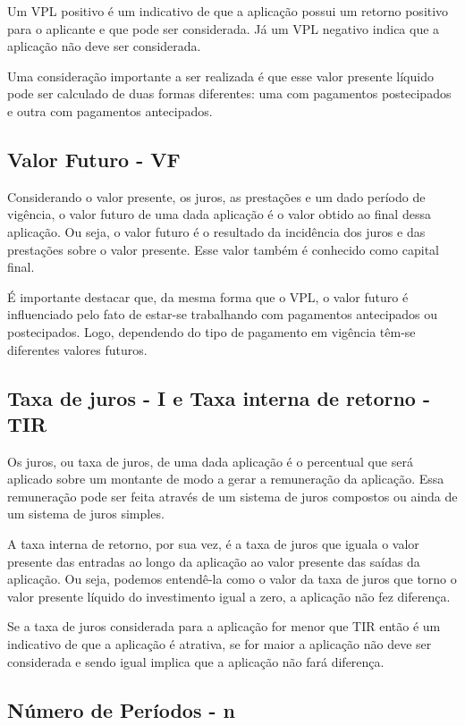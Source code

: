 Um VPL positivo é um indicativo de que a aplicação possui um retorno positivo para o aplicante e que pode ser considerada. Já um VPL negativo indica que a aplicação não deve ser considerada. \cite{vpl}

Uma consideração importante a ser realizada é que esse valor presente líquido pode ser calculado de duas formas diferentes: uma com pagamentos postecipados e outra com pagamentos antecipados.

\subsection{Valor Futuro - VF}

Considerando o valor presente, os juros, as prestações e um dado período de vigência, o valor futuro de uma dada aplicação é o valor obtido ao final dessa aplicação. Ou seja, o valor futuro é o resultado da incidência dos juros e das prestações sobre o valor presente. Esse valor também é conhecido como capital final.

É importante destacar que, da mesma forma que o VPL, o valor futuro é influenciado pelo fato de estar-se trabalhando com pagamentos antecipados ou postecipados. Logo, dependendo do tipo de pagamento em vigência têm-se diferentes valores futuros.

\subsection{Taxa de juros - I e Taxa interna de retorno - TIR}

Os juros, ou taxa de juros, de uma dada aplicação é o percentual que será aplicado sobre um montante de modo a gerar a remuneração da aplicação. Essa remuneração pode ser feita através de um sistema de juros compostos ou ainda de um sistema de juros simples.

A taxa interna de retorno, por sua vez, é a taxa de juros que iguala o valor presente das entradas ao longo da aplicação ao valor presente das saídas da aplicação. Ou seja, podemos entendê-la como o valor da taxa de juros que torno o valor presente líquido do investimento igual a zero, a aplicação não fez diferença.

Se a taxa de juros considerada para a aplicação for menor que TIR então é um indicativo de que a aplicação é atrativa, se for maior a aplicação não deve ser considerada e sendo igual implica que a aplicação não fará diferença. \cite{irr}

\subsection{Número de Períodos - n}

